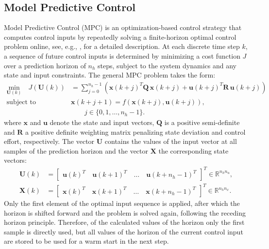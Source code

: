 \subsection{Model Predictive Control}
Model Predictive Control (MPC) is an optimization-based control strategy that computes control inputs by repeatedly solving a finite-horizon optimal control problem online, see, e.g., \cite{rawlings2017model}, for a detailed description. At each discrete time step $k$, a sequence of future control inputs is determined by minimizing a cost function $J$ over a prediction horizon of $n_h$ steps, subject to the system dynamics and any state and input constraints. The general MPC problem takes the form:
\begin{equation}\label{eqMPCGeneral}
    \begin{aligned}
        \underset{\bm{U}(k)}{\text{min}}\quad
        J(\bm{U}(k))
        &= \sum\limits_{j=0}^{n_h-1}
        \left(
        \bm{x}(k+j)^T \bm{Q}\,\bm{x}(k+j)
        + \bm{u}(k+j)^T \bm{R}\,\bm{u}(k+j)
        \right) \\
        \text{subject to}\quad
        &\bm{x}(k+j+1)
        = f(\bm{x}(k+j),\bm{u}(k+j)),\\
        &\qquad j \in \{0,1,\dots,n_h-1\}.
    \end{aligned}
\end{equation}
where $\bm{x}$ and $\bm{u}$ denote the state and input vectors, $\bm{Q}$ is a positive semi-definite and $\bm{R}$ a positive definite weighting matrix penalizing state deviation and control effort, respectively. The vector $\bm{U}$ contains the values of the input vector at all samples of the prediction horizon and the vector $\bm{X}$ the corresponding state vectors:
\begin{align*}
    \bm{U}(k) &= \begin{bmatrix} \bm{u}(k)^T \quad \bm{u}(k+1)^T \quad \ldots \quad  \bm{u}(k+n_h-1)^T \end{bmatrix}^T \in \mathbb{R}^{n_h n_u },\\
    \bm{X}(k) &= \begin{bmatrix} \bm{x}(k)^T \quad \bm{x}(k+1)^T \quad \ldots \quad  \bm{x}(k+n_h-1)^T \end{bmatrix}^T \in \mathbb{R}^{n_h n_x }.
\end{align*}
%
Only the first element of the optimal input sequence is applied, after which the horizon is shifted forward and the problem is solved again, following the receding horizon principle. Therefore, of the calculated values of the horizon only the first sample is directly used, but all values of the horizon of the current control input are stored to be used for a warm start in the next step.


